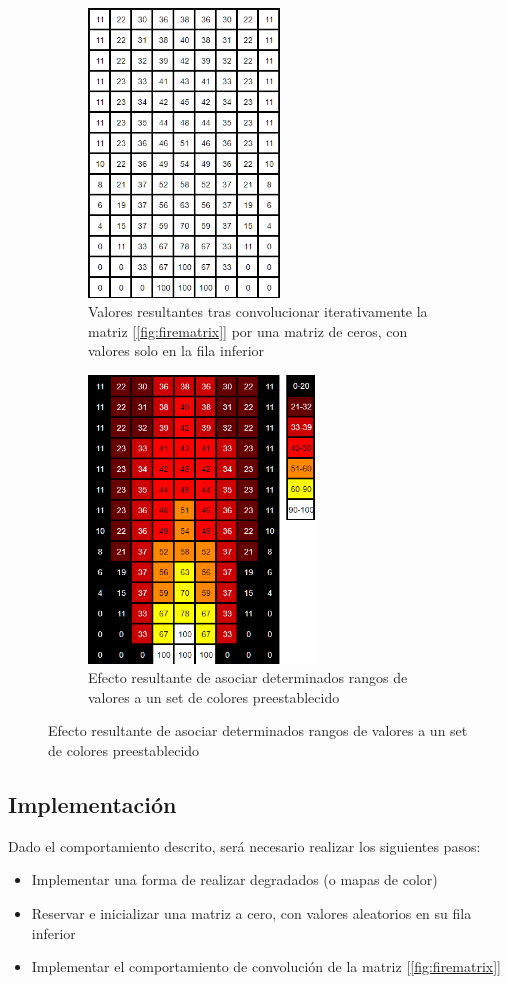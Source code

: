 \begin{figure}[h]
	\centering
	\begin{subfigure}[b]{0.45\textwidth}
		\centering
		\includegraphics[width=5.09cm]{archivos/fire_whitegrid}
		\caption{Valores resultantes tras convolucionar iterativamente la matriz [\ref{fig:firematrix}] por una matriz de ceros, con valores solo en la fila inferior}
		\label{fig:fire_whitegrid}
	\end{subfigure}
	\begin{subfigure}[b]{0.45\textwidth}
		\centering
		\includegraphics[width=6cm]{archivos/fire_colouredgrid}
		\caption{Efecto resultante de asociar determinados rangos de valores a un set de colores preestablecido}
		\label{fig:fire_colouredgrid}
	\end{subfigure}
\end{figure}

\subsection{Implementación}

Dado el comportamiento descrito, será necesario realizar los siguientes pasos:
\begin{itemize}
	\item Implementar una forma de realizar degradados (o mapas de color)
	\item Reservar e inicializar una matriz a cero, con valores aleatorios en su fila inferior
	\item Implementar el comportamiento de convolución de la matriz [\ref{fig:firematrix}]
\end{itemize}

